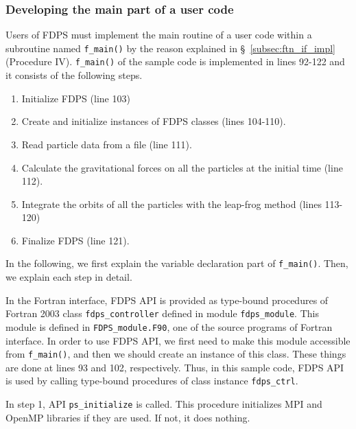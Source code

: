 \documentclass[proof,useamsfonts]{pasj01}
\begin{document}
\subsubsection{Developing the main part of a user code}
Users of FDPS must implement the main routine of a user code within a subroutine named \texttt{f\_main()} by the reason explained in \S~\ref{subsec:ftn_if_impl} (Procedure IV). \texttt{f\_main()} of the sample code is implemented in lines 92-122 and it consists of the following steps.
\begin{enumerate}
\item Initialize FDPS (line 103)
\item Create and initialize instances of FDPS classes (lines 104-110).
\item Read particle data from a file (line 111).
\item Calculate the gravitational forces on all the particles at the initial time (line 112).
\item Integrate the orbits of all the particles with the leap-frog method (lines 113-120)
\item Finalize FDPS (line 121).
\end{enumerate}
In the following, we first explain the variable declaration part of \texttt{f\_main()}. Then, we explain each step in detail.

In the Fortran interface, FDPS API is provided as type-bound procedures of  Fortran 2003 class \texttt{fdps\_controller} defined in module \texttt{fdps\_module}. This module is defined in \texttt{FDPS\_module.F90}, one of the source programs of Fortran interface. In order to use FDPS API, we first need to make this module accessible from \texttt{f\_main()}, and then we should create an instance of this class. These things are done at lines 93 and 102, respectively. Thus, in this sample code, FDPS API is used by calling type-bound procedures of class instance \texttt{fdps\_ctrl}. 

In step 1, API \texttt{ps\_initialize} is called. This procedure initializes MPI and OpenMP libraries if they are used. If not, it does nothing.
\end{document}
